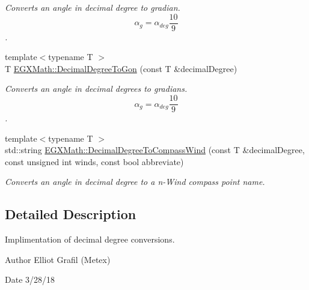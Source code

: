 \begin{DoxyCompactItemize}
\begin{DoxyCompactList}\small\item\em Converts an angle in decimal degree to gradian. \[\alpha_{g}=\alpha_{deg}\frac{10}{9}\]. \end{DoxyCompactList}\item 
{\footnotesize template$<$typename T $>$ }\\T \mbox{\hyperlink{group___e_g_x_math-_angle_conversions-_decimal_degree_gaeb333a1ad0aeb913c025fbd1be85fcb3}{E\+G\+X\+Math\+::\+Decimal\+Degree\+To\+Gon}} (const T \&decimal\+Degree)
\begin{DoxyCompactList}\small\item\em Converts an angle in decimal degrees to gradians. \[\alpha_{g}=\alpha_{deg}\frac{10}{9}\]. \end{DoxyCompactList}\item 
{\footnotesize template$<$typename T $>$ }\\std\+::string \mbox{\hyperlink{group___e_g_x_math-_angle_conversions-_decimal_degree_ga415a94651a2b2397b7f2bda90a19ee2c}{E\+G\+X\+Math\+::\+Decimal\+Degree\+To\+Compass\+Wind}} (const T \&decimal\+Degree, const unsigned int winds, const bool abbreviate)
\begin{DoxyCompactList}\small\item\em Converts an angle in decimal degree to a n-\/\+Wind compass point name. \end{DoxyCompactList}\end{DoxyCompactItemize}


\subsection{Detailed Description}
Implimentation of decimal degree conversions. 

\begin{DoxyAuthor}{Author}
Elliot Grafil (Metex) 
\end{DoxyAuthor}
\begin{DoxyDate}{Date}
3/28/18 
\end{DoxyDate}

